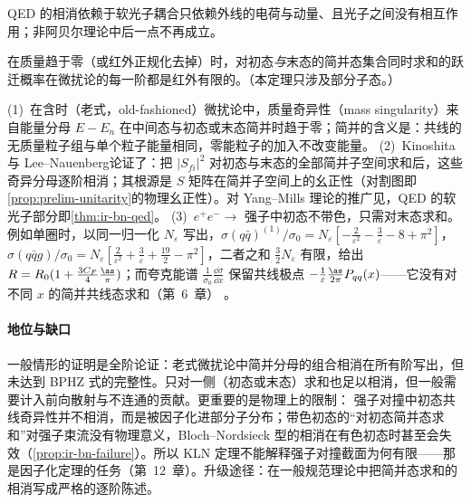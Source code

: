 QED 的相消依赖于软光子耦合只依赖外线的电荷与动量、且光子之间没有相互作用；非阿贝尔理论中后一点不再成立。

\begin{theorem}\label{thm:ir-kln}
在质量趋于零（或红外正规化去掉）时，对初态\emph{与}末态的简并态集合同时求和的跃迁概率在微扰论的每一阶都是红外有限的。（本定理只涉及部分子态。）
\end{theorem}
\begin{proofsketch}
(1)~在含时（老式，old-fashioned）微扰论中，质量奇异性（mass singularity）来自能量分母 $E-E_n$ 在中间态与初态或末态简并时趋于零；简并的含义是：共线的无质量粒子组与单个粒子能量相同，零能粒子的加入不改变能量。
(2)~Kinoshita\cite{Kinoshita1962}与 Lee--Nauenberg\cite{LeeNauenberg1964}论证了：把 $|S_{fi}|^2$ 对初态与末态的全部简并子空间求和后，这些奇异分母逐阶相消；其根源是 $S$ 矩阵在简并子空间上的幺正性（对割图即\cref{prop:prelim-unitarity}的物理幺正性）。对 Yang--Mills 理论的推广见\cite{Sterman:1976jh}，QED 的软光子部分即\cref{thm:ir-bn-qed}。
(3)~$e^+e^-\to$ 强子中初态不带色，只需对末态求和。例如单圈时，以同一归一化 $N_\varepsilon$ 写出，$\sigma(q\bar q)^{(1)}/\sigma_0=N_\varepsilon[-\frac2{\varepsilon^2}-\frac3\varepsilon-8+\pi^2]$，$\sigma(q\bar qg)/\sigma_0=N_\varepsilon[\frac2{\varepsilon^2}+\frac3\varepsilon+\frac{19}2-\pi^2]$，二者之和 $\frac32N_\varepsilon$ 有限，给出 $R=R_0(1+\frac{3C_F}4\frac{\as}\pi)$；而夸克能谱 $\frac1{\sigma_0}\frac{\dd\sigma}{\dd x}$ 保留共线极点 $-\frac1\varepsilon\frac{\as}{2\pi}P_{qq}(x)$——它没有对不同 $x$ 的简并共线态求和（第~6~章）%
。
\end{proofsketch}

\paragraph{地位与缺口}
一般情形的证明是全阶论证：老式微扰论中简并分母的组合相消在所有阶写出，但未达到 BPHZ 式的完整性。只对一侧（初态或末态）求和也足以相消，但一般需要计入前向散射与不连通的贡献\cite{Frye:2018xjj}。更重要的是物理上的限制：%
强子对撞中初态共线奇异性并不相消，而是被因子化进部分子分布；带色初态的“对初态简并态求和”对强子束流没有物理意义，Bloch--Nordsieck 型的相消在有色初态时甚至会失效（\cref{prop:ir-bn-failure}）。所以 KLN 定理不能解释强子对撞截面为何有限——那是因子化定理的任务（第~12~章）。升级途径：在一般规范理论中把简并态求和的相消写成严格的逐阶陈述。

